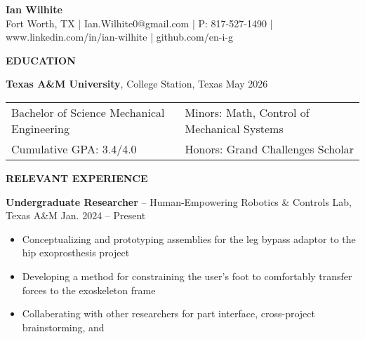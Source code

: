 \documentclass[18pt]{article}
\begin{document}

\begin{center}
    \LARGE \textbf{Ian Wilhite}\\ 
    \small Fort Worth, TX | Ian.Wilhite0@gmail.com | P: 817-527-1490 | www.linkedin.com/in/ian-wilhite | github.com/en-i-g
    
\end{center}


\vspace{-\baselineskip}
\begin{center}
    \textbf{EDUCATION}
    \hrulefill
\end{center}
\vspace{-0.5\baselineskip}


\textbf{Texas A\&M University}, College Station, Texas \hfill May 2026

\begin{tabular}{l|l} %
    Bachelor of Science Mechanical Engineering \hspace*{0.5in} & Minors: Math, Control of Mechanical Systems \\ 
    Cumulative GPA: 3.4/4.0 & Honors: Grand Challenges Scholar\\
\end{tabular}


\vspace{-0.5\baselineskip}
\begin{center}
    \textbf{RELEVANT EXPERIENCE}
    \hrulefill
\end{center}
\vspace{-0.5\baselineskip}


\textbf{Undergraduate Researcher} – Human-Empowering Robotics \& Controls Lab, Texas A\&M \hfill Jan. 2024 – Present

\begin{itemize}[noitemsep]
    \vspace{-0.75\baselineskip}
    \item Conceptualizing and prototyping assemblies for the leg bypass adaptor to the hip exoprosthesis project
    \item Developing a method for constraining the user’s foot to comfortably transfer forces to the exoskeleton frame
    \item Collaberating with other researchers for part interface, cross-project brainstorming, and 
\end{itemize}
\end{document}
